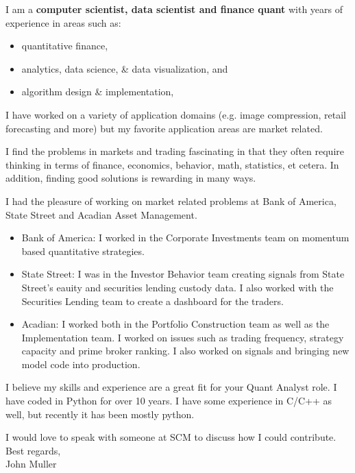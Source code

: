 \documentclass{letter}
\begin{document}
\noindent
I am a \textbf {computer scientist, data scientist and finance quant} with years of experience 
in areas such as:
\vspace{-.1in}
\begin{itemize}[noitemsep]
 \item quantitative finance, 
 \item analytics, data science, \& data visualization, and
 \item algorithm design \& implementation,
\end{itemize}

\noindent I have worked on a variety of application domains 
(e.g. image compression, retail forecasting and more)
but my favorite application areas are market related.

\noindent I find the problems in markets and trading fascinating in that they often require thinking in terms of finance, economics, behavior, math, statistics, et cetera.
In addition, finding good solutions is rewarding in many ways.


\noindent
I had the pleasure of working on market related 
problems at Bank of America, State Street and Acadian Asset Management.
\begin{itemize}
\item Bank of America: I worked in the Corporate Investments team on momentum based quantitative strategies.

\item State Street: I was in the Investor Behavior team 
 creating signals from State Street's eauity and securities lending custody data.
 I also worked with the Securities Lending team to create a dashboard for the traders.
 
\item Acadian: I worked both in the Portfolio Construction team as well as the Implementation team. I worked on issues such as trading frequency, strategy capacity and prime broker ranking. I also worked on signals and bringing new model code into production.
 \end{itemize}
 

\noindent
I believe my skills and experience are a great fit for your Quant Analyst role.  I have coded in Python for over 10 years. I have some experience in C/C++ as well, but recently it has been mostly python.

\noindent
I would love to speak with someone at SCM to discuss how I could contribute.\\

\noindent Best regards,\\
John Muller
\end{document}
